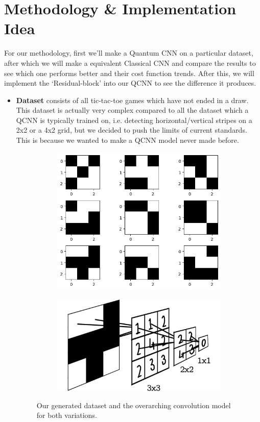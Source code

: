 \documentclass[a4paper]{article}
\begin{document}
\section*{Methodology \& Implementation Idea}

For our methodology, first we'll make a Quantum CNN on a particular dataset, after which we will make a equivalent Classical CNN and compare the results to see which one performs better and their cost function trends. After this, we will implement the `Residual-block' into our QCNN to see the difference it produces. 
\begin{itemize}
\item \textbf{Dataset} consists of all tic-tac-toe games which have not ended in a draw. This dataset is actually very complex compared to all the dataset which a QCNN is typically trained on, i.e. detecting horizontal/vertical stripes on a 2x2 or a 4x2 grid, but we decided to push the limits of current standards. This is because we wanted to make a QCNN model never made before.

\begin{figure}[h]
\centering
\begin{subfigure}{.5\textwidth}
  \centering
\includegraphics[height = 0.5\textwidth]{assets/dataset.jpeg}
  \label{fig:sub1}
\end{subfigure}%
\begin{subfigure}{.5\textwidth}
  \centering
  \includegraphics[height=.5\linewidth]{assets/CCNN.png}
  \label{fig:sub2}
\end{subfigure}
\caption{Our generated dataset and the overarching convolution model for both variations.}
\label{fig:test}
\end{figure}


\end{itemize}
\end{document}
